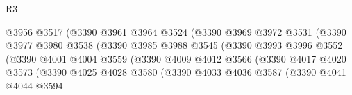 \begin{lexlean}{R3}
\begin{coremodule}
                                        @3956
                                        @3517
                                        (@3390
                                          @3961
                                          @3964
                                          @3524
                                          (@3390
                                            @3969
                                            @3972
                                            @3531
                                            (@3390
                                              @3977
                                              @3980
                                              @3538
                                              (@3390
                                                @3985
                                                @3988
                                                @3545
                                                (@3390
                                                  @3993
                                                  @3996
                                                  @3552
                                                  (@3390
                                                    @4001
                                                    @4004
                                                    @3559
                                                    (@3390
                                                      @4009
                                                      @4012
                                                      @3566
                                                      (@3390
                                                        @4017
                                                        @4020
                                                        @3573
                                                        (@3390
                                                          @4025
                                                          @4028
                                                          @3580
                                                          (@3390
                                                            @4033
                                                            @4036
                                                            @3587
                                                            (@3390
                                                              @4041
                                                              @4044
                                                              @3594

\end{coremodule}
\end{lexlean}

